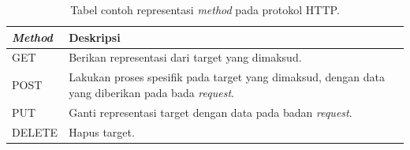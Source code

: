     \begin{table}[]
    \centering
    \caption{Tabel contoh representasi \textit{method} pada protokol HTTP.}
    \label{tab:http_method}
    \begin{tabular}{| p{3cm} | p{5cm} |}
    \hline
    \textit{Method} & Deskripsi                                                                                        \\ \hline
    GET             & Berikan representasi dari target yang dimaksud.                                                  \\ \hline
    POST            & Lakukan proses spesifik pada target yang dimaksud, dengan 
                        data yang diberikan pada bada \textit{request}. \\ \hline
    PUT             & Ganti representasi target dengan data pada badan \textit{request}.                                        \\ \hline
    DELETE          & Hapus target.                                                                                    \\ \hline
    \end{tabular}
    \end{table}
    


